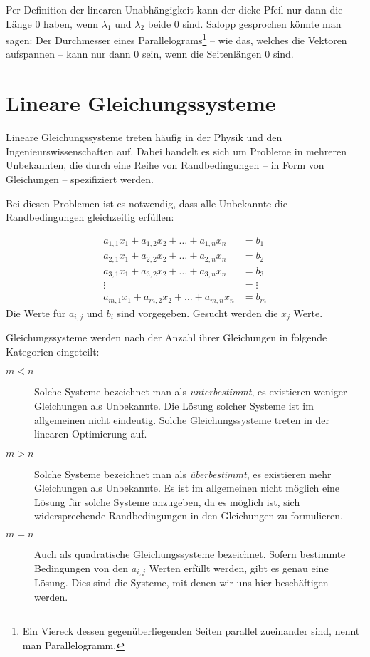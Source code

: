 \bigskip

Per Definition der linearen Unabhängigkeit kann der dicke Pfeil nur dann die Länge 0 haben, wenn $\lambda_1$ und $\lambda_2$ beide 0 sind. Salopp gesprochen könnte man sagen: Der Durchmesser eines Parallelograms\footnote{Ein Viereck dessen gegenüberliegenden Seiten parallel zueinander sind, nennt man Parallelogramm.} -- wie das, welches die Vektoren aufspannen -- kann nur dann 0 sein, wenn die Seitenlängen 0 sind.


\section{Lineare Gleichungssysteme}

Lineare Gleichungssysteme treten häufig in der Physik und den Ingenieurswissenschaften auf. Dabei handelt es sich um Probleme in mehreren Unbekannten, die durch eine Reihe von Randbedingungen -- in Form von Gleichungen -- spezifiziert werden.

Bei diesen Problemen ist es notwendig, dass alle Unbekannte die Randbedingungen gleichzeitig erfüllen:

\begin{equation}\label{eq:syseq}
\begin{split}
a_{1,1}x_1 + a_{1,2}x_2 + \dots + a_{1,n}x_n &= b_1 \\
a_{2,1}x_1 + a_{2,2}x_2 + \dots + a_{2,n}x_n &= b_2 \\
a_{3,1}x_1 + a_{3,2}x_2 + \dots + a_{3,n}x_n &= b_3 \\
\vdots &= \vdots \\
a_{m,1}x_1 + a_{m,2}x_2 + \dots + a_{m,n}x_n &= b_m 
\end{split}
\end{equation}
Die Werte für $a_{i,j}$ und $b_{i}$ sind vorgegeben. Gesucht werden die $x_j$ Werte. 

Gleichungssysteme werden nach der Anzahl ihrer Gleichungen in folgende Kategorien eingeteilt:

\begin{description}
\item[$m<n$] Solche Systeme bezeichnet man als \textsl{unterbestimmt}, es existieren weniger Gleichungen als Unbekannte. Die Lösung solcher Systeme ist im allgemeinen nicht eindeutig. Solche Gleichungssysteme treten in der linearen Optimierung auf. 
\item[$m>n$] Solche Systeme bezeichnet man als \textsl{überbestimmt}, es existieren mehr Gleichungen als Unbekannte. Es ist im allgemeinen nicht möglich eine Lösung für solche Systeme anzugeben, da es möglich ist, sich widersprechende Randbedingungen in den Gleichungen zu formulieren. 
\item[$m=n$] Auch als quadratische Gleichungssysteme bezeichnet. Sofern bestimmte Bedingungen von den $a_{i,j}$ Werten erfüllt werden, gibt es genau eine Lösung. Dies sind die Systeme, mit denen wir uns hier beschäftigen werden.
\end{description}

